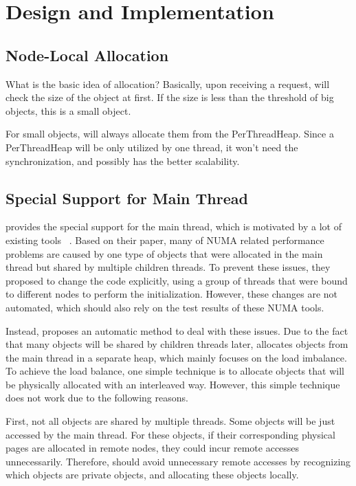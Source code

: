 \section{Design and Implementation}
\label{sec:implement}

\subsection{Node-Local Allocation}

What is the basic idea of allocation? 
Basically, upon receiving a request, \NM{} will check the size of the object at first. If the size is less than the threshold of big objects, this is a small object. 

For small objects, \NM{} will always allocate them from the PerThreadHeap. Since a PerThreadHeap will be only utilized by one thread, it won't need the synchronization, and possibly has the better scalability. 

\subsection{Special Support for Main Thread}
\NM{} provides the special support for the main thread, which is motivated by a lot of existing tools ~\cite{XULIU, MemProf}. Based on their paper, many of NUMA related performance problems are caused by one type of objects that were allocated in the main thread but shared by multiple children threads. To prevent these issues, they proposed to change the code explicitly, using a group of threads that were bound to different nodes to perform the initialization. However, these changes are not automated, which should also rely on the test results of these NUMA tools.  

Instead, \NM{} proposes an automatic method to deal with these issues. Due to the fact that many objects will be shared by children threads later, \NM{} allocates objects from the main thread in a separate heap, which mainly focuses on the load imbalance. To achieve the load balance, one simple technique is to allocate objects that will be physically allocated with an interleaved way. However, this simple technique does not work due to the following reasons. 

First, not all objects are shared by multiple threads. Some objects will be just accessed by the main thread. For these objects, if their corresponding physical pages are allocated in remote nodes, they could  incur remote accesses unnecessarily. Therefore, \NM{} should avoid unnecessary remote accesses by recognizing which objects are private objects, and allocating these objects locally.  

